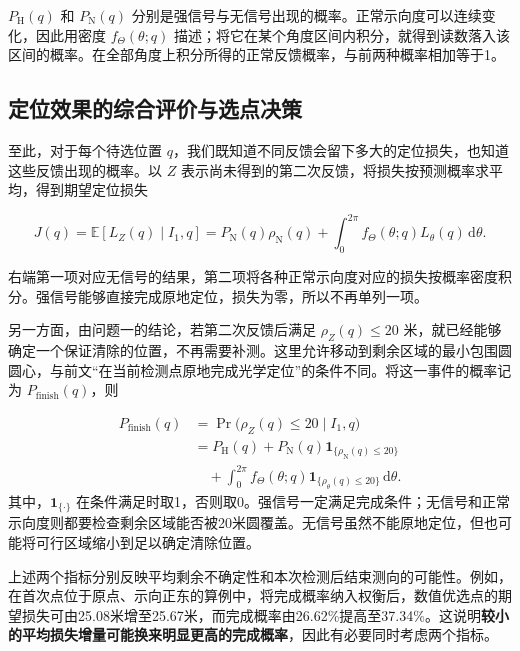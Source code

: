 \documentclass[UTF8,a4paper,zihao=-4,fontset=none]{ctexart}
\begin{document}
\(P_{\mathrm H}(q)\) 和 \(P_{\mathrm N}(q)\) 分别是强信号与无信号出现的概率。正常示向度可以连续变化，因此用密度 \(f_\Theta(\theta;q)\) 描述；将它在某个角度区间内积分，就得到读数落入该区间的概率。在全部角度上积分所得的正常反馈概率，与前两种概率相加等于1。

\subsection{定位效果的综合评价与选点决策}

至此，对于每个待选位置 \(q\)，我们既知道不同反馈会留下多大的定位损失，也知道这些反馈出现的概率。以 \(Z\) 表示尚未得到的第二次反馈，将损失按预测概率求平均，得到期望定位损失

\begin{equation}
 J(q)=\mathbb E[L_Z(q)\mid I_1,q]
 =P_{\mathrm N}(q)\rho_{\mathrm N}(q)
 +\int_0^{2\pi}f_\Theta(\theta;q)L_\theta(q)\,\mathrm d\theta.
\label{eq:q2-pair-expected-objective}
\end{equation}

右端第一项对应无信号的结果，第二项将各种正常示向度对应的损失按概率密度积分。强信号能够直接完成原地定位，损失为零，所以不再单列一项。

另一方面，由问题一的结论，若第二次反馈后满足 \(\rho_Z(q)\le20\) 米，就已经能够确定一个保证清除的位置，不再需要补测。这里允许移动到剩余区域的最小包围圆圆心，与前文“在当前检测点原地完成光学定位”的条件不同。将这一事件的概率记为 \(P_{\mathrm{finish}}(q)\)，则

\begin{equation}
\begin{aligned}
 P_{\mathrm{finish}}(q)
 &=\Pr\bigl(\rho_Z(q)\le20\mid I_1,q\bigr)\\
 &=P_{\mathrm H}(q)+P_{\mathrm N}(q)\mathbf1_{\{\rho_{\mathrm N}(q)\le20\}}\\
 &\quad+\int_0^{2\pi}f_\Theta(\theta;q)\mathbf1_{\{\rho_\theta(q)\le20\}}\,\mathrm d\theta.
\end{aligned}
\label{eq:q2-completion-probability}
\end{equation}
其中，\(\mathbf1_{\{\cdot\}}\) 在条件满足时取1，否则取0。强信号一定满足完成条件；无信号和正常示向度则都要检查剩余区域能否被20米圆覆盖。无信号虽然不能原地定位，但也可能将可行区域缩小到足以确定清除位置。

上述两个指标分别反映平均剩余不确定性和本次检测后结束测向的可能性。例如，在首次点位于原点、示向正东的算例中，将完成概率纳入权衡后，数值优选点的期望损失可由25.08米增至25.67米，而完成概率由26.62\%提高至37.34\%。这说明\textbf{较小的平均损失增量可能换来明显更高的完成概率}，因此有必要同时考虑两个指标。
\end{document}
